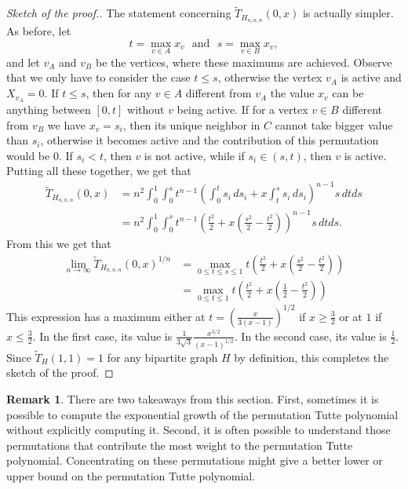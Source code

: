 \documentclass[12pt,a4paper]{amsart}
\numberwithin{equation}{section}
\theoremstyle{plain}
\theoremstyle{definition}
\newtheorem{Rem}[Th]{Remark}
\newcommand{\1}{\textbf{1}}
\newcommand{\wT}{\widetilde{T}}
\begin{document}
\begin{proof}[Sketch of the proof.]
The statement concerning $\wT_{H_{n,n,n}}(0,x)$ is actually simpler. 
As before, let
$$t=\max_{v\in A}x_v\ \ \ \text{and}\ \ \ s=\max_{v\in B}x_v,$$
and let $v_A$ and $v_B$ be the vertices, where these maximums are achieved. Observe that we only have to consider the case $t\leqslant s$, otherwise the vertex $v_A$ is active and $X_{v_A}=0$. If $t\leqslant s$, then for any $v\in A$ different from $v_A$ the value $x_v$ can be anything between $[0,t]$ without $v$ being active. If for a vertex $v\in B$ different from $v_B$ we have $x_v=s_i$, then its unique neighbor in $C$ cannot take bigger value than $s_i$, otherwise it becomes active and the contribution of this permutation would be $0$. If $s_i<t$, then $v$ is not active, while if $s_i\in (s,t)$, then $v$ is active.  Putting all these together, we get that
\begin{align*}
\wT_{H_{n,n,n}}(0,x)&=n^2\int_0^1\int_0^st^{n-1}\left(\int_0^ts_i\, ds_i+x\int_t^ss_i\, ds_i\right)^{n-1}s\, dtds\\
&=n^2\int_0^1\int_0^st^{n-1}\left(\frac{t^2}{2}+x\left(\frac{s^2}{2}-\frac{t^2}{2}\right)\right)^{n-1}s\, dt ds.
\end{align*}
From this we get that
\begin{align*}
\lim_{n\to \infty}\wT_{H_{n,n,n}}(0,x)^{1/n}&=\max_{0\leqslant   t\leqslant   s\leqslant   1}t\left(\frac{t^2}{2}+x\left(\frac{s^2}{2}-\frac{t^2}{2}\right)\right)\\
&=\max_{0\leqslant   t\leqslant   1}t\left(\frac{t^2}{2}+x\left(\frac{1}{2}-\frac{t^2}{2}\right)\right)
\end{align*}
This expression has a maximum either at $t=\left(\frac{x}{3(x-1)}\right)^{1/2}$ if $x\geqslant\frac{3}{2}$ or at $1$ if $x\leqslant   \frac{3}{2}$. In the first case, its value is $\frac{1}{3\sqrt{3}}\frac{x^{3/2}}{(x-1)^{1/2}}$. In the second case, its value is $\frac{1}{2}$. Since $\wT_H(1,1)=1$ for any bipartite graph $H$ by definition, this completes the sketch of the proof.
\end{proof}

\begin{Rem}
There are two takeaways from this section. First, sometimes it is possible to compute the exponential growth of the permutation Tutte polynomial without explicitly computing it. Second, it is often possible to understand those permutations that contribute the most weight to the permutation Tutte polynomial. Concentrating on these permutations might give a better lower or upper bound on the permutation Tutte polynomial.
\end{Rem}
\end{document}
